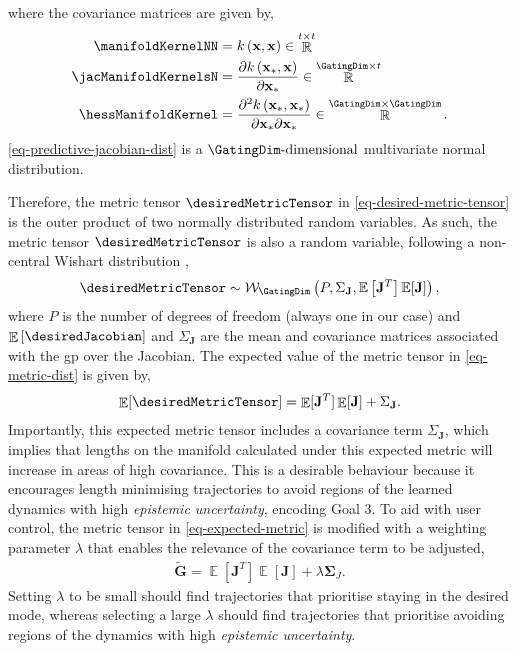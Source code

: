 \documentclass{mimosis-class/mimosis}
\numberwithin{equation}{chapter}
\DeclareMathOperator{\R}{\mathbb{R}}
\DeclareMathOperator{\E}{\mathbb{E}}
\newcommand{\numData}{\ensuremath{t}}
\newcommand{\testInd}{\ensuremath{*}}
\newcommand{\NumData}{\ensuremath{\MakeUppercase{\numData}}}
\newcommand{\allData}[1]{\ensuremath{\MakeUppercase{#1}}}
\newcommand{\state}{\ensuremath{\mathbf{x}}}
\newcommand{\x}{\ensuremath{\mathbf{x}}}
\newcommand{\allInput}{\ensuremath{\allData{\x}}}
\newcommand{\singleTest}[1]{\ensuremath{#1_{\testInd}}}
\newcommand{\testInput}{\ensuremath{\singleTest{\state}}}
\newcommand{\Jac}{\ensuremath{\mathbf{J}}}
\newcommand{\muJac}{\ensuremath{\mu_{\Jac}}}
\newcommand{\covJac}{\ensuremath{\Sigma_{\Jac}}}
\begin{document}
{\begin{myquote}
where the covariance matrices are given by,
\begin{align} \label{eq}
\manifoldKernelNN &= k\left( \allInput, \allInput \right) \in \R^{\NumData \times \NumData} \\
\jacManifoldKernelsN&= \frac{\partial k\left(\testInput, \allInput\right)}{\partial \testInput} \in \R^{\GatingDim \times \NumData} \\
\hessManifoldKernel &= \frac{\partial^2 k\left(\testInput, \testInput \right)}{\partial \testInput \partial \testInput} \in \R^{\GatingDim \times \GatingDim}.
\end{align}
\cref{eq-predictive-jacobian-dist} is a $\GatingDim\text{-dimensional}$ multivariate normal distribution.
\end{myquote}

Therefore, the metric tensor \(\desiredMetricTensor\) in \cref{eq-desired-metric-tensor} is the outer product of
two normally distributed random variables.
As such, the metric tensor \(\desiredMetricTensor\) is also a random variable, following
a non-central Wishart distribution \citep{andersonNonCentral1946},
\begin{align} \label{eq-metric-dist}
  \desiredMetricTensor \sim
  \mathcal{W}_{\GatingDim}\left(P, \covJac, \mathbb{E}\left[\Jac^{T}\right] \mathbb{E}[\Jac]\right),
\end{align}
where \(P\) is the number of degrees of freedom (always one in our case) and
\(\E\left[\desiredJacobian\right]\) and \(\covJac\) are the mean and covariance matrices
associated with the \acrshort{gp} over the Jacobian.
The expected value of the metric tensor in \cref{eq-metric-dist} is given by,
\begin{align} \label{eq-expected-metric}
  \E[\desiredMetricTensor] = \E[\mathbf{J}^T] \E[\mathbf{J}] + \covJac.
\end{align}
Importantly, this expected metric tensor includes a covariance term \(\covJac\),
which implies that lengths on the manifold calculated under this expected metric will
increase in areas of high covariance.
This is a desirable behaviour because it encourages length minimising trajectories
to avoid regions of the learned dynamics with high \emph{epistemic uncertainty},
encoding Goal 3.
To aid with user control, the metric tensor in \cref{eq-expected-metric} is modified with
a weighting parameter \(\lambda\) that enables the relevance of the covariance term to be adjusted,
\begin{align} \label{eq-expected-metric-weighting}
  \tilde{\mathbf{G}} = \E[\mathbf{J}^T] \E[\mathbf{J}] + \lambda \mathbf{\Sigma}_J.
\end{align}
Setting \(\lambda\) to be small should find trajectories that prioritise staying in the desired mode,
whereas selecting a large \(\lambda\) should find trajectories that prioritise avoiding regions
of the dynamics with high \emph{epistemic uncertainty}.

}
\end{document}
